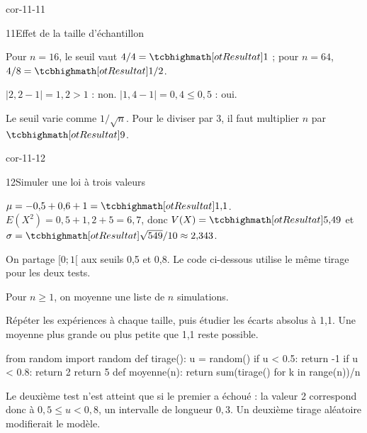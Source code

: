 \begin{blocLivre}{cor-11-11}
\begin{corrige}{11}{Effet de la taille d'échantillon}
\begin{questions}
\item Pour $n=16$, le seuil vaut $4/4=\res{1}$ ; pour $n=64$, $4/8=\res{1/2}$.
\item $|2{,}2-1|=1{,}2>1$ : non. $|1{,}4-1|=0{,}4\leq0{,}5$ : oui.
\item Le seuil varie comme $1/\sqrt n$. Pour le diviser par 3, il faut multiplier $n$ par $\res{9}$.
\end{questions}
\end{corrige}
\end{blocLivre}
\begin{blocLivre}{cor-11-12}
\begin{corrige}{12}{Simuler une loi à trois valeurs}
\begin{questions}
\item $\mu=-0{,}5+0{,}6+1=\res{1{,}1}$. $E(X^2)=0{,}5+1{,}2+5=6{,}7$, donc $V(X)=\res{5{,}49}$ et $\sigma=\res{\sqrt{549}/10\approx2{,}343}$.
\item On partage $[0;1[$ aux seuils 0,5 et 0,8. Le code ci-dessous utilise le même tirage pour les deux tests.
\item Pour $n\geq1$, on moyenne une liste de $n$ simulations.
\item Répéter les expériences à chaque taille, puis étudier les écarts absolus à 1,1. Une moyenne plus grande ou plus petite que 1,1 reste possible.
\end{questions}
\begin{python}
from random import random
def tirage():
    u = random()
    if u < 0.5:
        return -1
    if u < 0.8:
        return 2
    return 5
def moyenne(n):
    return sum(tirage() for k in range(n))/n
\end{python}

Le deuxième test n’est atteint que si le premier a échoué : la valeur 2 correspond donc à $0{,}5\leq u<0{,}8$, un intervalle de longueur $0{,}3$. Un deuxième tirage aléatoire modifierait le modèle.

\label{figlivre-r11-12-partition-cor}

\end{corrige}
\end{blocLivre}
